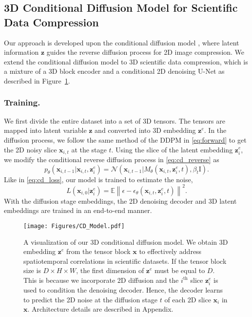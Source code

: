 \subsection{3D Conditional Diffusion Model for Scientific Data Compression}

Our approach is developed upon the conditional diffusion model \cite{Yang2023cd}, where latent information $\boldsymbol{z}$ guides the reverse diffusion process for 2D image compression. We extend the conditional diffusion model to 3D scientific data compression, which is a mixture of a 3D block encoder and a conditional 2D denoising U-Net as described in Figure~\ref{fig:cd_model}.
\vspace{-0.4cm}
\subsubsection{Training.}
We first divide the entire dataset into a set of 3D tensors. The tensors are mapped into latent variable $\boldsymbol{z}$ and converted into 3D embedding $\boldsymbol{z}^e$. In the diffusion process, we follow the same method of the DDPM in \eqref{eq:forward} to get the 2D noisy slice $\boldsymbol{x}_{i,t}$ at the stage $t$. Using the slice of the latent embedding $\boldsymbol{z}_i^e$, we modify the conditional reverse diffusion process in \eqref{eq:cd_reverse} as
\begin{equation}\label{eq:our_reverse}
    p_\theta\left(\boldsymbol{x}_{i,t-1}|\boldsymbol{x}_{i,t}, \boldsymbol{z}_i^e\right)=\mathcal{N}\left(\boldsymbol{x}_{i,t-1}|M_\theta\left(\boldsymbol{x}_{i,t}, \boldsymbol{z}_i^e, t\right),\beta_t\boldsymbol{\mathrm{I}}\right).
\end{equation}
Like in \eqref{eq:cd_loss}, our model is trained to estimate the noise,
\begin{equation}\label{eq:our_loss}
    L\left(\boldsymbol{x}_{i,0}|\boldsymbol{z}_i^e\right)=\mathbb{E}\left\|\epsilon-\epsilon_\theta\left(\boldsymbol{x}_{i,t},\boldsymbol{z}_i^e, t\right)\right\|^2.
\end{equation}
With the diffusion stage embeddings, the 2D denoising decoder and 3D latent embeddings are trained in an end-to-end manner.

\begin{figure}[ht]
    \centering
    \texttt{[image: Figures/CD\_Model.pdf]}
    \caption{A visualization of our 3D conditional diffusion model. We obtain 3D embedding $\boldsymbol{z}^e$ from the tensor block $\boldsymbol{x}$ to effectively address spatiotemporal correlations in scientific datasets. If the tensor block size is $D\times H\times W$, the first dimension of $\boldsymbol{z}^e$ must be equal to $D$. This is because we incorporate 2D diffusion and the $i^\mathrm{th}$ slice $\boldsymbol{z}_i^e$ is used to condition the denoising decoder. Hence, the decoder learns to predict the 2D noise at the diffusion stage $t$ of each 2D slice $\boldsymbol{x}_i$ in $\boldsymbol{x}$. Architecture details are described in Appendix.}\label{fig:cd_model}
    \vspace{-0.4cm}
\end{figure}

